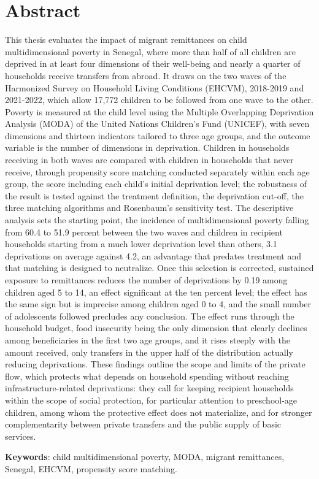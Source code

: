 \section*{Abstract}

This thesis evaluates the impact of migrant
remittances on child multidimensional poverty in Senegal, where more
than half of all children are deprived in at least four dimensions of
their well-being and nearly a quarter of households receive transfers
from abroad. It draws on the two waves of the Harmonized Survey on
Household Living Conditions (EHCVM), 2018-2019 and 2021-2022, which allow
17,772 children to be followed from one wave to the other. Poverty is
measured at the child level using the Multiple Overlapping Deprivation
Analysis (MODA) of the United Nations Children's Fund (UNICEF), with seven
dimensions and thirteen indicators tailored to three age groups, and
the outcome variable is the number of dimensions in deprivation.
Children in households receiving in both waves are compared with
children in households that never receive, through propensity score
matching conducted separately within each age group, the score
including each child's initial deprivation level; the robustness of the
result is tested against the treatment definition, the deprivation
cut-off, the three matching algorithms and Rosenbaum's sensitivity
test. The descriptive analysis sets the starting point, the incidence
of multidimensional poverty falling from 60.4 to 51.9 percent between
the two waves and children in recipient households starting from a much
lower deprivation level than others, 3.1 deprivations on average
against 4.2, an advantage that predates treatment and that matching is
designed to neutralize. Once this selection is corrected, sustained
exposure to remittances reduces the number of deprivations by 0.19
among children aged 5 to 14, an effect significant at the ten percent
level; the effect has the same sign but is imprecise among children
aged 0 to 4, and the small number of adolescents followed precludes any
conclusion. The effect runs through the household budget, food
insecurity being the only dimension that clearly declines among
beneficiaries in the first two age groups, and it rises steeply with
the amount received, only transfers in the upper half of the
distribution actually reducing deprivations. These findings outline the
scope and limits of the private flow, which protects what depends on
household spending without reaching infrastructure-related
deprivations: they call for keeping recipient households within the
scope of social protection, for particular attention to preschool-age
children, among whom the protective effect does not materialize, and
for stronger complementarity between private transfers and the public
supply of basic services.

\bigskip

\noindent \textbf{Keywords}: child multidimensional poverty, MODA,
migrant remittances, Senegal, EHCVM, propensity score matching.

